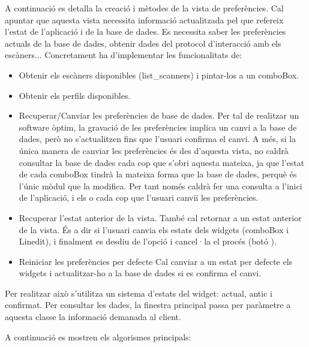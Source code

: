 \documentclass[letterpaper,11pt,catalan]{sphinxmanual}
\begin{document}
A continuació es detalla la creació i mètodes de la vista de preferències. Cal apuntar que aquesta
vista necessita informació actualitzada pel que refereix l'estat de l'aplicació i de la base de dades.
Es necessita saber les preferències actuals de la base de dades, obtenir dades del protocol d'interacció amb els escàners...
Concretament ha d'implementar les funcionalitats de:
\begin{itemize}
\item {} 
Obtenir els escàners disponibles (list\_scanners) i pintar-los a un comboBox.

\item {} 
Obtenir els perfils disponibles.

\item {} 
Recuperar/Canviar les preferències de base de dades.
Per tal de realitzar un software òptim, la gravació de les preferències implica un canvi
a la base de dades, però no s'actualitzen fins que l'usuari confirma el canvi.
A més, si la única manera de canviar les preferències és des d'aquesta vista, no caldrà consultar
la base de dades cada cop que s'obri aquesta mateixa, ja que l'estat de cada comboBox tindrà la mateixa
forma que la base de dades, perquè és l'únic mòdul que la modifica. Per tant només caldrà
fer una consulta a l'inici de l'aplicació, i els  o  cada cop que l'usuari canviï les preferències.

\item {} 
Recuperar l'estat anterior de la vista.
També cal retornar a un estat anterior de la vista. És a dir si l'usuari canvia els estats dels widgets
(comboBox i Linedit), i finalment es desdiu de l'opció i cancel·la el procés (botó ).

\item {} 
Reiniciar les preferències per defecte
Cal canviar a un estat per defecte els widgets i actualitzar-ho a la base de dades si es confirma el canvi.

\end{itemize}

Per realitzar això s'utilitza un sistema d'estats del widget: actual, antic i confirmat.
Per consultar les dades, la finestra principal passa per paràmetre a aquesta classe la informació
demanada al client.

A continuació es mostren els algorismes principals:
\end{document}
